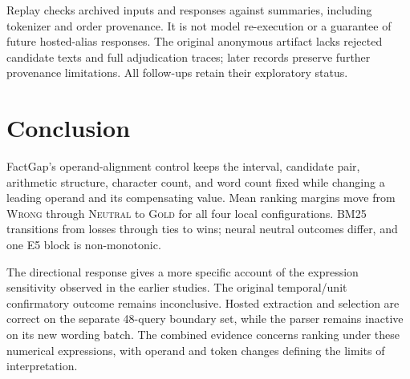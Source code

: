 \documentclass[conference,letterpaper]{IEEEtran}
\newcommand{\wrong}{\textsc{Wrong}}
\newcommand{\neutral}{\textsc{Neutral}}
\newcommand{\gold}{\textsc{Gold}}
\begin{document}
Replay checks archived inputs and responses against summaries, including tokenizer and order provenance. It is not model re-execution or a guarantee of future hosted-alias responses. The original anonymous artifact lacks rejected candidate texts and full adjudication traces; later records preserve further provenance limitations. All follow-ups retain their exploratory status.


\section{Conclusion}
FactGap's operand-alignment control keeps the interval, candidate pair, arithmetic structure, character count, and word count fixed while changing a leading operand and its compensating value. Mean ranking margins move from \wrong{} through \neutral{} to \gold{} for all four local configurations. BM25 transitions from losses through ties to wins; neural neutral outcomes differ, and one E5 block is non-monotonic.

The directional response gives a more specific account of the expression sensitivity observed in the earlier studies. The original temporal/unit confirmatory outcome remains inconclusive. Hosted extraction and selection are correct on the separate 48-query boundary set, while the parser remains inactive on its new wording batch. The combined evidence concerns ranking under these numerical expressions, with operand and token changes defining the limits of interpretation.


\appendices
\end{document}
